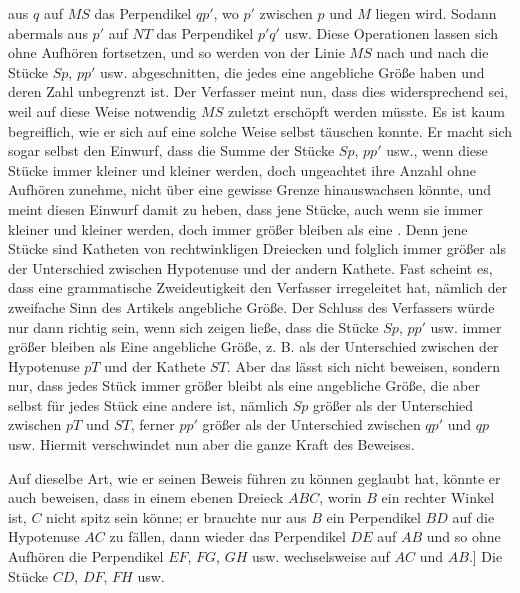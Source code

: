 aus $q$ auf $MS$ das Perpendikel $qp'$, wo $p'$ zwischen $p$ und $M$
liegen wird. Sodann abermals aus $p'$ auf $NT$ das Perpendikel $p'q'$ usw.
Diese Operationen lassen sich ohne Aufhören fortsetzen, und so werden von der
Linie $MS$ nach und nach die Stücke $Sp$, $pp'$ usw. abgeschnitten, die jedes
eine angebliche Größe haben und deren Zahl unbegrenzt ist. Der Verfasser meint
nun, dass dies widersprechend sei, weil auf diese Weise notwendig $MS$ zuletzt
erschöpft werden müsste. Es ist kaum begreiflich, wie er sich auf eine solche
Weise selbst täuschen konnte. Er macht sich sogar selbst den Einwurf, dass die
Summe der Stücke $Sp$, $pp'$ usw., wenn diese Stücke immer kleiner und
kleiner werden, doch ungeachtet ihre Anzahl ohne Aufhören zunehme, nicht über
eine gewisse Grenze hinauswachsen könnte, und meint diesen Einwurf damit zu
heben, dass jene Stücke, auch wenn sie immer kleiner und kleiner werden, doch
  immer größer bleiben als eine . Denn jene Stücke
sind Katheten von rechtwinkligen Dreiecken und folglich immer größer als der
Unterschied zwischen Hypotenuse und der andern Kathete. Fast scheint es, dass
eine grammatische Zweideutigkeit den Verfasser irregeleitet hat, nämlich der
  zweifache Sinn des Artikels  angebliche Größe. Der Schluss des
Verfassers würde nur dann richtig sein, wenn sich zeigen ließe, dass die Stücke $Sp$,
  $pp'$ usw. immer größer bleiben als Eine  angebliche
  Größe, z. B. als der Unterschied zwischen der Hypotenuse $pT$ und der Kathete
$ST$. Aber das lässt sich nicht beweisen, sondern nur, dass jedes Stück immer
größer bleibt als eine angebliche Größe, die aber selbst für jedes Stück eine
andere ist, nämlich $Sp$ größer als der Unterschied zwischen $pT$ und $ST$,
ferner $pp'$ größer als der Unterschied zwischen $qp'$ und $qp$ usw.
Hiermit verschwindet nun aber die ganze Kraft des Beweises.

\begin{center}\end{center}

Auf dieselbe Art, wie er seinen Beweis führen zu können geglaubt hat, könnte er
auch beweisen, dass in einem ebenen Dreieck $ABC$, worin $B$ ein rechter Winkel
ist, $C$ nicht spitz sein könne; er brauchte nur aus $B$ ein Perpendikel $BD$ auf
die Hypotenuse $AC$ zu fällen, dann wieder das Perpendikel $DE$ auf $AB$ und so
ohne Aufhören die Perpendikel $EF$, $FG$, $GH$ usw. wechselsweise auf $AC$
und $AB$.] Die Stücke $CD$, $DF$, $FH$ usw.
